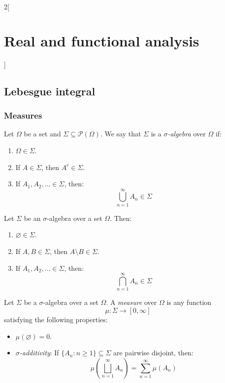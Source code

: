 \documentclass[../../../main.tex]{subfiles}
\begin{document}
\renewcommand{\col}{\ana}
\begin{multicols}{2}[\section{Real and functional analysis}]
  \subsection{Lebesgue integral}
  \subsubsection{Measures}
  \begin{definition}
    Let $\Omega$ be a set and $\Sigma\subseteq\mathcal{P}(\Omega)$. We say that $\Sigma$ is a \emph{$\sigma$-algebra} over $\Omega$ if:
    \begin{enumerate}
      \item $\Omega\in\Sigma$.
      \item If $A\in\Sigma$, then $A^c\in\Sigma$.
      \item If $A_1,A_2,\ldots\in\Sigma$, then: $$\bigcup_{n=1}^\infty A_n\in\Sigma$$
    \end{enumerate}
  \end{definition}
  \begin{proposition}
    Let $\Sigma$ be an $\sigma$-algebra over a set $\Omega$. Then:
    \begin{enumerate}
      \item $\varnothing\in\Sigma$.
      \item If $A,B\in\Sigma$, then $A\setminus B\in\Sigma$.
      \item If $A_1,A_2,\ldots\in\Sigma$, then: $$\bigcap_{n=1}^\infty A_n\in\Sigma$$
    \end{enumerate}
  \end{proposition}
  \begin{definition}[Measure]
    Let $\Sigma$ be a $\sigma$-algebra over a set $\Omega$. A \emph{measure} over $\Omega$ is any function $$\mu:\Sigma\longrightarrow[0,\infty]$$ satisfying the following properties:
    \begin{itemize}
      \item $\mu(\varnothing)=0$.
      \item \emph{$\sigma$-additivity}: If $\{A_n:n\geq1\}\subseteq\Sigma$ are pairwise disjoint, then: $$\mu\left(\bigsqcup_{n=1}^\infty A_n\right)=\sum_{n=1}^\infty \mu(A_n)$$
    \end{itemize}

\end{definition}
\end{multicols}
\end{document}
